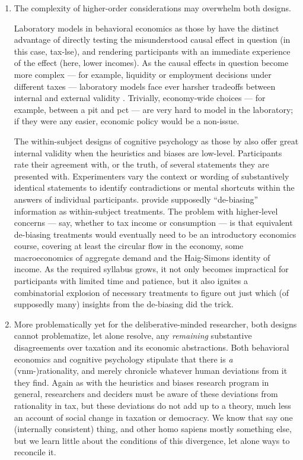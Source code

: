 \begin{enumerate}
	\item The complexity of higher-order considerations may overwhelm both designs.

	Laboratory models in behavioral economics as those by \citeauthor{SausgruberTyran2011} have the distinct advantage of directly testing the misunderstood causal effect in question (in this case, \gls{tax-lse}), and rendering participants with an immediate experience of the effect (here, lower incomes).
	As the causal effects in question become more complex --- for example, liquidity or employment decisions under different taxes --- laboratory models face ever harsher tradeoffs between internal and external validity \citep[for a review and dissenting opinion, see][]{Jimenez-Buedo2010}.
	Trivially, economy-wide choices --- for example, between a \gls{pit} and \gls{pct} --- are very hard to model in the laboratory;
	if they were any easier, economic policy would be a non-issue.

	The within-subject designs of cognitive psychology as those by \citeauthor{McCafferyBaron2004} also offer great internal validity when the heuristics and biases are low-level.
	Participants rate their agreement with, or the truth, of several statements they are presented with.
	Experimenters vary the context or wording of substantively identical statements to identify contradictions or mental shortcuts within the answers of individual participants.
	\citeauthor{McCafferyBaron2004} provide supposedly ``de-biasing'' information as within-subject treatments.
	The problem with higher-level concerns --- say, whether to tax income or consumption --- is that equivalent de-biasing treatments would eventually need to be an introductory economics course, covering at least the circular flow in the economy, some macroeconomics of aggregate demand and the Haig-Simons identity of income.
	As the required syllabus grows, it not only becomes impractical for participants with limited time and patience, but it also ignites a combinatorial explosion of necessary treatments to figure out just which (of supposedly many) insights from the de-biasing did the trick.

	\item More problematically yet for the deliberative-minded researcher, both designs cannot problematize, let alone resolve, any \emph{remaining} substantive disagreements over taxation and its economic abstractions.
	Both behavioral economics and cognitive psychology stipulate that there is \emph{a} (\gls{vnm}-)rationality, and merely chronicle whatever human deviations from it they find.
	Again as with the heuristics and biases research program in general, researchers and deciders must be aware of these deviations from rationality in tax, but these deviations do not add up to a theory, much less an account of social change in taxation or democracy.
	We know that \citeauthor{VonNeumannMorgenstern1944} say one (internally consistent) thing, and other homo sapiens mostly something else, but we learn little about the conditions of this divergence, let alone ways to reconcile it.


\end{enumerate}
